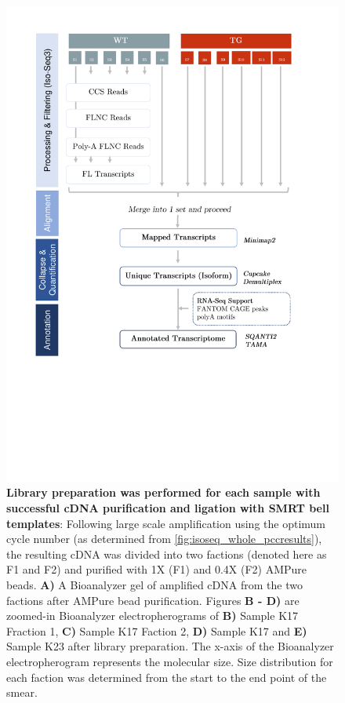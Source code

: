 \begin{figure}[!htp]
	\centering
	\vspace{20pt}
	\includegraphics[page=3,trim={1cm 12cm 0 0cm},clip,scale = 0.8]{Figures/WholeTranscriptome_Figures.pdf}
	\captionsetup{width=0.95\textwidth}
	\caption[Iso-Seq Whole Transcriptome - cDNA purification and library preparation]%
	{\textbf{Library preparation was performed for each sample with successful cDNA purification and ligation with SMRT bell templates}: Following large scale amplification using the optimum cycle number (as determined from \cref{fig:isoseq_whole_pccresults}), the resulting cDNA was divided into two factions (denoted here as F1 and F2) and purified with 1X (F1) and 0.4X (F2) AMPure beads. \textbf{A)} A Bioanalyzer gel of amplified cDNA from the two factions after AMPure bead purification. Figures \textbf{B - D)} are zoomed-in Bioanalyzer electropherograms of \textbf{B)} Sample K17 Fraction 1, \textbf{C)} Sample K17 Faction 2, \textbf{D)} Sample K17 and \textbf{E)} Sample K23 after library preparation. The x-axis of the Bioanalyzer electropherogram represents the molecular size. Size distribution for each faction was determined from the start to the end point of the smear. 
}
\end{figure}
